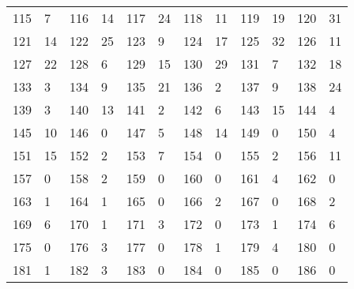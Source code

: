 \begin{longtable}{llllllllllll}
115 & 7&116 &14&117& 24&118 &11&119 &19&120& 31\\
121 & 14&122 &25&123& 9&124 &17&125 &32&126& 11\\
127 & 22&128 &6&129& 15&130 &29&131 &7&132& 18\\
133 & 3&134 &9&135& 21&136 &2&137 &9&138& 24\\
139 & 3&140 &13&141& 2&142 &6&143 &15&144& 4\\
145 & 10&146 &0&147& 5&148 &14&149 &0&150& 4\\
151 & 15&152 &2&153& 7&154 &0&155 &2&156& 11\\
157 & 0&158 &2&159& 0&160 &0&161 &4&162& 0\\
163 & 1&164 &1&165& 0&166 &2&167 &0&168& 2\\
169 & 6&170 &1&171& 3&172 &0&173 &1&174& 6\\
175 & 0&176 &3&177& 0&178 &1&179 &4&180& 0\\
181 & 1&182 &3&183& 0&184 &0&185 &0&186& 0\\
\bottomrule\end{longtable}
